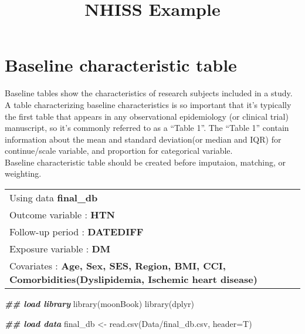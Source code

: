 \documentclass[
]{book}
\title{NHISS Example}
\author{}
\date{\vspace{-2.5em}}
\newenvironment{Shaded}{\begin{snugshade}}{\end{snugshade}}
\newcommand{\AttributeTok}[1]{\textcolor[rgb]{0.77,0.63,0.00}{#1}}
\newcommand{\DocumentationTok}[1]{\textcolor[rgb]{0.56,0.35,0.01}{\textbf{\textit{#1}}}}
\newcommand{\FunctionTok}[1]{\textcolor[rgb]{0.00,0.00,0.00}{#1}}
\newcommand{\NormalTok}[1]{#1}
\newcommand{\OtherTok}[1]{\textcolor[rgb]{0.56,0.35,0.01}{#1}}
\newcommand{\StringTok}[1]{\textcolor[rgb]{0.31,0.60,0.02}{#1}}
\theoremstyle{definition}
\theoremstyle{definition}
\theoremstyle{definition}
\theoremstyle{definition}
\theoremstyle{remark}
\begin{document}
\maketitle

{
\setcounter{tocdepth}{1}
\tableofcontents
}
\hypertarget{baseline-characteristic-table}{%
\chapter{Baseline characteristic table}\label{baseline-characteristic-table}}

Baseline tables show the characteristics of research subjects included in a study. A table characterizing baseline characteristics is so important that it's typically the first table that appears in any observational epidemiology (or clinical trial) manuscript, so it's commonly referred to as a ``Table 1''. The ``Table 1'' contain information about the mean and standard deviation(or median and IQR) for continue/scale variable, and proportion for categorical variable.\\

Baseline characteristic table should be created before imputaion, matching, or weighting.

\begin{longtable}[]{@{}l@{}}
\toprule()
\endhead
Using data \textbf{final\_db} \\
Outcome variable : \textbf{HTN} \\
Follow-up period : \textbf{DATEDIFF} \\
Exposure variable : \textbf{DM} \\
Covariates : \textbf{Age, Sex, SES, Region, BMI, CCI, Comorbidities(Dyslipidemia, Ischemic heart disease)} \\
\bottomrule()
\end{longtable}

\begin{Shaded}
\begin{Highlighting}[]
\DocumentationTok{\#\# load library}
\FunctionTok{library}\NormalTok{(moonBook)}
\FunctionTok{library}\NormalTok{(dplyr)}
\end{Highlighting}
\end{Shaded}

\begin{Shaded}
\begin{Highlighting}[]
\DocumentationTok{\#\# load data}
\NormalTok{final\_db }\OtherTok{\textless{}{-}} \FunctionTok{read.csv}\NormalTok{(}\StringTok{\textquotesingle{}Data/final\_db.csv\textquotesingle{}}\NormalTok{, }\AttributeTok{header=}\NormalTok{T)}
\end{Highlighting}
\end{Shaded}
\end{document}
